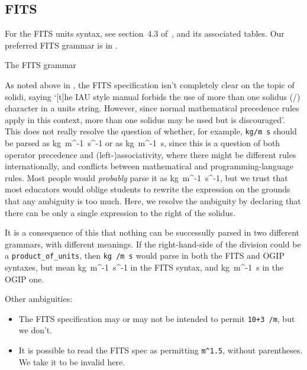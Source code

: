 \documentclass[11pt,notitlepage,onecolumn]{ivoa}
\makeatletter
\def\units{\@ifstar{\let\un@tsspace\relax    \un@ts}%
                   {\let\un@tsspace\thinspace\un@ts}}
\newcommand{\un@ts}[1]{{\let~\thinspace
  \ifmmode
    \un@tsspace\mathrm{#1}%
  \else
    \nobreak$\un@tsspace\mathrm{#1}$%
  \fi}}
\makeatother
\begin{document}
\subsection{FITS}
\label{appx:fitsgrammar}

For the FITS units syntax, see section~4.3 of~\cite{pence10}, and its
associated tables.  Our preferred FITS grammar is in
.

\begin{table}[ht]

\caption{\label{tabx:fitsgrammar}The FITS grammar}
\end{table}

As noted above in , 
the FITS specification isn't completely clear on the topic of 
solidi, saying `[t]he IAU style manual forbids
the use of more than one solidus (/) character in a units
string. However, since normal mathematical precedence rules apply
in this context, more than one solidus may be used but is
discouraged'.  This does not really resolve the question of whether, for
example, \texttt{kg/m s} should be parsed as \units{kg~m^{-1}~s^{-1}}
or as \units{kg~m^{-1}~s}, since this is a question of both operator
precedence and (left-)associativity, where there might be different
rules internationally, and conflicts between mathematical and
programming-language rules.  Most people would \emph{probably} parse
it as \units{kg~m^{-1}~s^{-1}}, but we trust that most educators would
oblige students to rewrite the expression on the grounds that any
ambiguity is too much.
Here, we resolve the ambiguity by declaring that there can
be only a single expression to the right of the solidus.

It is a consequence of this that nothing can be
successully parsed in two different grammars, with different
meanings.  If the right-hand-side of the division could be a
\texttt{product\_of\_units}, then \texttt{kg /m s} would parse in both
the FITS and OGIP syntaxes,
but mean \units{kg~m^{-1}~s^{-1}} in the FITS syntax, and
\units{kg~m^{-1}~s} in the OGIP one.

Other ambiguities:
\begin{itemize}
\item The FITS specification may or may not be intended to permit 
  \texttt{10+3 /m}, but we don't.
\item It is possible to read the FITS spec as permitting
  \texttt{m\^{}1.5}, without parentheses.  We take it to be
  invalid here.
\end{itemize}
\end{document}

